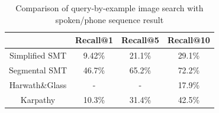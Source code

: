 \documentclass[journal]{IEEEtran}
\begin{document}
\begin{table}[t]
    \centering
    \begin{tabular}{|c|c|c|c|}
    \hline
        & Recall@1  & Recall@5   & Recall@10  \\
    \hline
        Simplified SMT & 9.42\% & 21.1\% & 29.1\% \\
        Segmental SMT & 46.7\% & 65.2\%  & 72.2\%  \\
        Harwath\&Glass\cite{Harwath15} & - & - & 17.9\%\\
        Karpathy\cite{Karpathy15} & 10.3\% & 31.4\% & 42.5\%\\
    \hline
    \end{tabular}
    \caption{Comparison of query-by-example image search with spoken/phone sequence result}
    \label{tab:retrieval_results}
\end{table}
%
%

\end{document}
